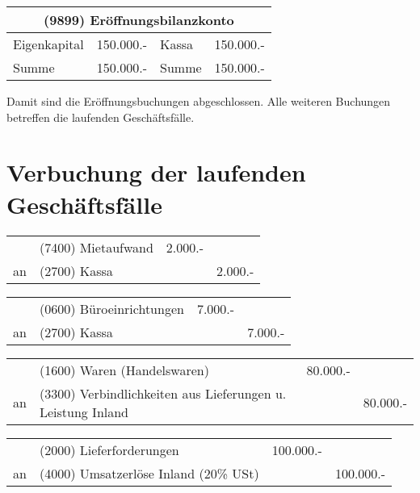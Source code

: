 \documentclass[parskip=half,12pt,a4paper]{scrartcl}
\begin{document}
\begin{center}
	\begin{tabular}{lr|lr}
		\multicolumn{4}{c}{(9899) Eröffnungsbilanzkonto}\\
		\toprule
		Eigenkapital & 150.000.- & Kassa & 150.000.- \\
		\bottomrule
		Summe & 150.000.- & Summe & 150.000.-\\
	\end{tabular}
\end{center}

Damit sind die Eröffnungsbuchungen abgeschlossen. Alle weiteren Buchungen betreffen die laufenden Geschäftsfälle.

\section{Verbuchung der laufenden Geschäftsfälle}

\begin{center}
\begin{tabularx}{\textwidth}{rXrr}
 \toprule
    & (7400) Mietaufwand & 2.000.- &\\
 an & (2700) Kassa & & 2.000.-\\
\bottomrule
\end{tabularx}
\end{center}

\begin{center}
\begin{tabularx}{\textwidth}{rXrr}
 \toprule
    & (0600) Büroeinrichtungen & 7.000.- &\\
 an & (2700) Kassa & & 7.000.-\\
\bottomrule
\end{tabularx}
\end{center}

\begin{center}
\begin{tabularx}{\textwidth}{rXrr}
 \toprule
    & (1600) Waren (Handelswaren) & 80.000.- &\\
 an & (3300) Verbindlichkeiten aus Lieferungen u. Leistung Inland & & 80.000.-\\
\bottomrule
\end{tabularx}
\end{center}

\begin{center}
\begin{tabularx}{\textwidth}{rXrr}
 \toprule
    & (2000) Lieferforderungen & 100.000.- &\\
 an & (4000) Umsatzerlöse Inland (20\% USt) & & 100.000.-\\
\bottomrule
\end{tabularx}
\end{center}
\end{document}
